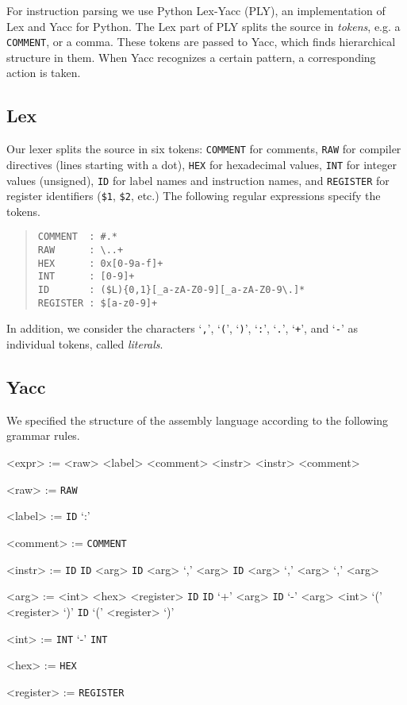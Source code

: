 \lstset{ %
language=Python,                %
}

For instruction parsing we use Python Lex-Yacc (PLY), an implementation of Lex and Yacc for Python. The Lex part of PLY splits the source in \emph{tokens}, e.g. a \verb!COMMENT!, or a comma. These tokens are passed to Yacc, which finds hierarchical structure in them. When Yacc recognizes a certain pattern, a corresponding action is taken.

\subsection{Lex}

Our lexer splits the source in six tokens: \verb!COMMENT! for comments, \verb!RAW! for compiler directives (lines starting with a dot), \verb!HEX! for hexadecimal values, \verb!INT! for integer values (unsigned), \verb!ID! for label names and instruction names, and \verb!REGISTER! for register identifiers (\verb!$1!, \verb!$2!, etc.)
The following regular expressions specify the tokens.
\begin{quote}
\begin{verbatim}
COMMENT  : #.*
RAW      : \..+
HEX      : 0x[0-9a-f]+
INT      : [0-9]+
ID       : ($L){0,1}[_a-zA-Z0-9][_a-zA-Z0-9\.]*
REGISTER : $[a-z0-9]+
\end{verbatim}
\end{quote}
In addition, we consider the characters `\verb!,!', `\verb!(!', `\verb!)!', `\verb!:!', `\verb!.!', `\verb!+!', and `\verb!-!' as individual tokens, called \emph{literals}.

\subsection{Yacc}
We specified the structure of the assembly language according to the following grammar rules.

\begin{grammar}
<expr> := <raw>
\alt <label>
\alt <comment>
\alt <instr>
\alt <instr> <comment>

<raw> := \verb!RAW!

<label> := \verb!ID! `:'

<comment> := \verb!COMMENT!

<instr> := \verb!ID!
\alt \verb!ID! <arg>
\alt \verb!ID! <arg> `,' <arg>
\alt \verb!ID! <arg> `,' <arg> `,' <arg>

<arg> := <int>
\alt <hex>
\alt <register>
\alt \verb!ID!
\alt \verb!ID! `+' <arg>
\alt \verb!ID! `-' <arg>
\alt <int> `(' <register> `)'
\alt \verb!ID!  `(' <register> `)'

<int> := \verb!INT!
\alt `-' \verb!INT!

<hex> := \verb!HEX!

<register> := \verb!REGISTER!
\end{grammar}


